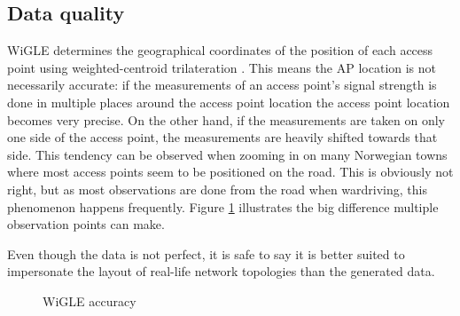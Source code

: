 \subsection{Data quality}
WiGLE determines the geographical coordinates of the position of each access point using weighted-centroid trilateration \cite{Sharma}. 
This means the AP location is not necessarily accurate:
if the measurements of an access point's signal strength is done in multiple places around the access point location
the access point location becomes very precise. On the other hand, if the measurements are taken on only one side of the access point,
the measurements are heavily shifted towards that side. This tendency can be observed
when zooming in on many Norwegian towns where most access points seem to be positioned on the road. This is obviously not right, but as most observations
are done from the road when wardriving, this phenomenon happens frequently. Figure \ref{fig:wiglediff} illustrates the big difference multiple observation points can make.

Even though the data is not perfect, it is safe to say it is better suited to impersonate the layout of real-life network topologies than the generated data.

\begin{figure}
	\centering
		\qquad
		\caption{WiGLE accuracy}%
		\label{fig:wiglediff}%
\end{figure}

